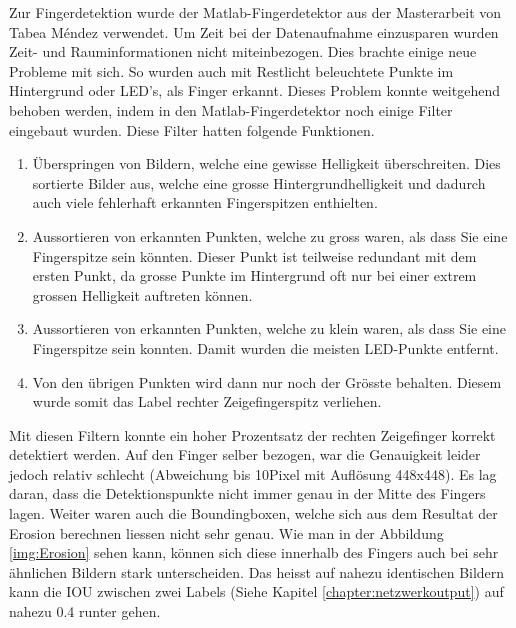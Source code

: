 Zur Fingerdetektion wurde der Matlab-Fingerdetektor aus der Masterarbeit von Tabea Méndez \cite{TabeasFingertracking} verwendet. 
Um Zeit bei der Datenaufnahme einzusparen wurden Zeit- und Rauminformationen nicht miteinbezogen. 
Dies brachte einige neue Probleme mit sich.   
So wurden auch mit Restlicht beleuchtete Punkte im Hintergrund oder LED's, als Finger erkannt.
Dieses Problem konnte weitgehend behoben werden, indem in den Matlab-Fingerdetektor noch einige Filter eingebaut wurden.
Diese Filter hatten folgende Funktionen.
\begin{enumerate}
\item Überspringen von Bildern, welche eine gewisse Helligkeit überschreiten. 
Dies sortierte Bilder aus, welche eine grosse Hintergrundhelligkeit und dadurch auch viele fehlerhaft erkannten Fingerspitzen enthielten.  
\item Aussortieren von erkannten Punkten, welche zu gross waren, als dass Sie eine Fingerspitze sein könnten. 
Dieser Punkt ist teilweise redundant mit dem ersten Punkt, da grosse Punkte im Hintergrund oft nur bei einer extrem grossen Helligkeit auftreten können.  
\item Aussortieren von erkannten Punkten, welche zu klein waren, als dass Sie eine Fingerspitze sein konnten. 
Damit wurden die meisten LED-Punkte entfernt.
\item Von den übrigen Punkten wird dann nur noch der Grösste behalten.
Diesem wurde somit das Label \grqq{}rechter Zeigefingerspitz\grqq{} verliehen. 
\end{enumerate}
Mit diesen Filtern konnte ein hoher Prozentsatz der rechten Zeigefinger korrekt detektiert werden.
Auf den Finger selber bezogen, war die Genauigkeit leider jedoch relativ schlecht (Abweichung bis 10Pixel mit Auflösung 448x448).
Es lag daran, dass die Detektionspunkte nicht immer genau in der Mitte des Fingers lagen. 
Weiter waren auch die Boundingboxen, welche sich aus dem Resultat der Erosion \cite{TabeasFingertracking} berechnen liessen nicht sehr genau.
Wie man in der Abbildung \ref{img:Erosion} sehen kann, können sich diese innerhalb des Fingers auch bei sehr ähnlichen Bildern stark unterscheiden.
Das heisst auf nahezu identischen Bildern kann die IOU zwischen zwei Labels (Siehe Kapitel \ref{chapter:netzwerkoutput}) auf nahezu 0.4 runter gehen. 


